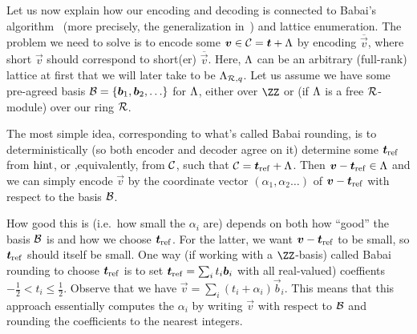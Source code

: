 \begin{remark}\label{rmk:RelationshipToBabai}
Let us now explain how our encoding and decoding is connected to Babai's algorithm~\cite{DBLP:journals/combinatorica/Babai86} (more precisely, the generalization in~\cite{RSA:LinPei11}) and lattice enumeration.
The problem we need to solve is to encode some $\boldsymbol{v}\in\mathcal{C} = \boldsymbol{t} + \Lambda$ by encoding $\overline{\vec{v}}$, where short $\vec{v}$ should correspond to short(er) $\overline{\vec{v}}$. Here, $\Lambda$ can be an arbitrary (full-rank) lattice at first that we will later take to be $\Lambda_{\mathcal{R},q}$. Let us assume we have some pre-agreed basis $\mathcal{B} = \{\boldsymbol{b}_1,\boldsymbol{b}_2,\ldots\}$ for $\Lambda$, either over $\ZZ$ or (if $\Lambda$ is a free $\mathcal{R}$-module) over our ring $\mathcal{R}$.

The most simple idea, corresponding to what's called Babai rounding, is to deterministically (so both encoder and decoder agree on it) determine some $\boldsymbol{t}_{\mathrm{ref}}$ from $\mathrm{hint}$, or ,equivalently, from $\mathcal{C}$, such that $\mathcal{C} = \boldsymbol{t}_{\mathrm{ref}} + \Lambda$. Then $\boldsymbol{v} - \boldsymbol{t}_{\mathrm{ref}} \in \Lambda$ and we can simply encode $\vec{v}$ by the coordinate vector $(\alpha_1,\alpha_2\ldots)$ of $\boldsymbol{v}-\boldsymbol{t}_{\mathrm{ref}}$ with respect to the basis $\mathcal{B}$.

How good this is (i.e.\ how small the $\alpha_i$ are) depends on both how ``good'' the basis $\mathcal{B}$ is and how we choose $\boldsymbol{t}_{\mathrm{ref}}$. For the latter, we want $\boldsymbol{v}-\boldsymbol{t}_{\mathrm{ref}}$ to be small, so $\boldsymbol{t}_{\mathrm{ref}}$ should itself be small. One way (if working with a $\ZZ$-basis) called Babai rounding to choose $\boldsymbol{t}_{\mathrm{ref}}$ is to set $\boldsymbol{t}_{\mathrm{ref}} = \sum_i  t_i\boldsymbol{b}_i$ with all real-valued) coeffients $-\tfrac12 < t_i \leq \tfrac12$. Observe that we have $\vec{v} = \sum_i (t_i + \alpha_i)\vec{b}_i$.  This means that this approach essentially computes the $\alpha_i$ by writing $\vec{v}$ with respect to $\mathcal{B}$ and rounding the coefficients to the nearest integers.


\end{remark}
